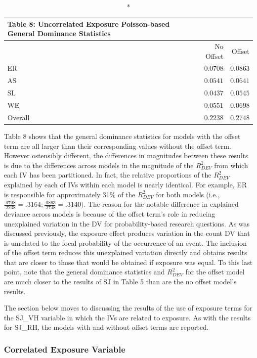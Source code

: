 \documentclass[ShortAfour,times,sageapa]{sagej}
\begin{document}
	\begin{longtable}{l|rr}
		\caption*{
			{\large Table 8: Uncorrelated Exposure Poisson-based General Dominance Statistics}
		} \\ 
		\toprule
		\multicolumn{1}{l}{} & No Offset & Offset \\ 
		\midrule
		ER & $0.0708$ & $0.0863$ \\ 
		AS & $0.0541$ & $0.0641$ \\ 
		SL & $0.0437$ & $0.0545$ \\ 
		WE & $0.0551$ & $0.0698$ \\ 
		\midrule
		Overall & $0.2238$ & $0.2748$ \\ 
		\bottomrule
	\end{longtable}
	
	Table 8 shows that the general dominance statistics for models with the offset term are all larger than their corresponding values without the offset term. 
	However ostensibly different, the differences in magnitudes between these results is due to the differences across models in the magnitude of the $R^2_{DEV}$ from which each IV has been partitioned.
	In fact, the relative proportions of the $R^2_{DEV}$ explained by each of IVs within each model is nearly identical.
	For example, ER is responsible for approximately 31\% of the $R^2_{DEV}$ for both models (i.e., $\frac{.0708}{.2238} = .3164; \frac{.0863}{.2748} = .3140)$.
	The reason for the notable difference in explained deviance across models is because of the offset term's role in reducing unexplained variation in the DV for probability-based research questions.
	As was discussed previously, the exposure effect produces variation in the count DV that is unrelated to the focal probability of the occurrence of an event.
	The inclusion of the offset term reduces this unexplained variation directly and obtains results that are closer to those that would be obtained if exposure was equal.
	To this last point, note that the general dominance statistics and $R^2_{DEV}$ for the offset model are much closer to the results of SJ in Table 5 than are the no offset model's results.
	
	The section below moves to discussing the results of the use of exposure terms for the SJ\_VH variable in which the IVs are related to exposure.
	As with the results for SJ\_RH, the models with and without offset terms are reported.
	
		\subsubsection{Correlated Exposure Variable}
		
\end{document}
